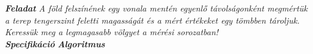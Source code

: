 \documentclass[12pt,twoside,a4paper]{article}	%
\newcommand{\fejezet}[1]{\noindent \textbf{\textit{\large #1 \vspace{1mm} \newline}}}
\begin{document}
\fejezet{Feladat}
\textit{A föld felszínének egy vonala mentén egyenlő távolságonként megmértük a terep tengerszint feletti magasságát és a mért értékeket egy tömbben tároljuk. Keressük meg a legmagasabb völgyet a mérési sorozatban!}
\vspace{3mm} \\
\fejezet{Specifikáció}
\fejezet{Algoritmus}
\end{document}
